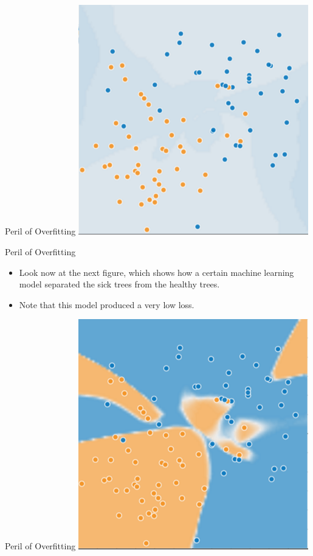 \documentclass{beamer}
\begin{document}

\begin{frame}{Peril of Overfitting}
\includegraphics[width=0.75\textwidth]{images/GeneralizationA.png}
\end{frame}

\begin{frame}{Peril of Overfitting}
\begin{itemize}
\item Look now at the next figure, which shows how a certain machine learning model separated the sick trees from the healthy trees. 

\medskip
\item Note that this model produced a very low loss.
\end{itemize}
\end{frame}

\begin{frame}{Peril of Overfitting}
\includegraphics[width=0.75\textwidth]{images/GeneralizationB.png}
\end{frame}
\end{document}
